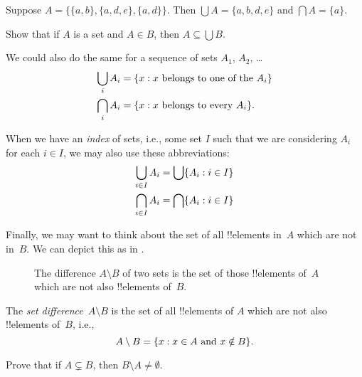 \documentclass[../../../include/open-logic-section]{subfiles}
\begin{document}
\begin{ex}
Suppose $A = \{ \{ a, b \}, \{ a, d, e \}, \{ a, d \} \}$.
Then $\bigcup A = \{ a, b, d, e \}$ and $\bigcap A = \{ a \}$.
\end{ex}
\begin{prob}
	Show that if $A$ is a set and $A \in B$, then $A \subseteq \bigcup B$.
\end{prob}

We could also do the same for a sequence of sets $A_1$, $A_2$, \dots
\begin{align*}
\bigcup_i A_i & = \Setabs{x}{x \text{ belongs to one of the } A_i}\\
\bigcap_i A_i & = \Setabs{x}{x \text{ belongs to every } A_i}.
\end{align*}

When we have an \emph{index} of sets, i.e., some set $I$ such that we
are considering $A_i$ for each $i \in I$, we may also use these
abbreviations:
\begin{align*}
	\bigcup_{i \in I} A_i & = \bigcup \Setabs{A_i }{i \in I}\\
	\bigcap_{i \in I} A_i & = \bigcap\Setabs{A_i}{i \in I}
\end{align*}

Finally, we may want to think about the set of all !!{element}s in~$A$
which are not in~$B$. We can depict this as in .

\begin{figure}
  \caption{The difference $A \setminus B$ of two sets is the set of
    those !!{element}s of~$A$ which are not also !!{element}s of~$B$.}
\end{figure}

\begin{defn}[Difference]
The \emph{set difference}~$A \setminus B$ is the set of all !!{element}s of
$A$ which are not also !!{element}s of~$B$, i.e.,
\[
A\setminus B = \{ x : x\in A \text{ and } x \notin B \}.
\]
\end{defn}

\begin{prob}
	Prove that if $A \subsetneq B$, then $B \setminus A \neq \emptyset$.
\end{prob}
\end{document}
